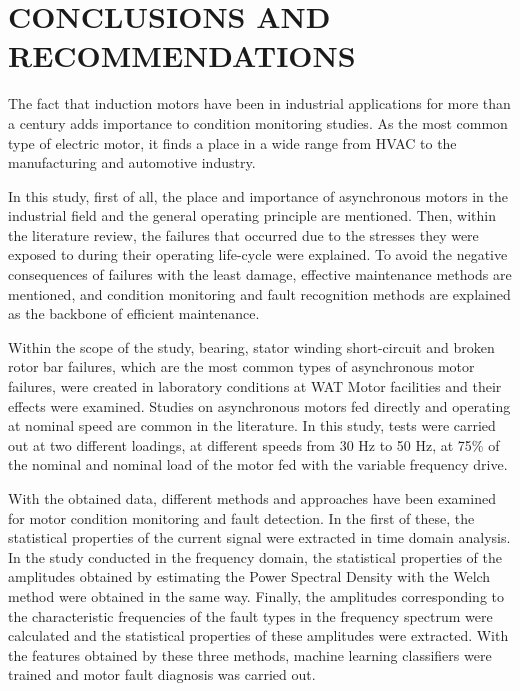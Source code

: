 \chapter{CONCLUSIONS AND RECOMMENDATIONS}\label{Ch5}

The fact that induction motors have been in industrial applications for more than a century adds importance to condition monitoring studies. As the most common type of electric motor, it finds a place in a wide range from HVAC to the manufacturing and automotive industry.

In this study, first of all, the place and importance of asynchronous motors in the industrial field and the general operating principle are mentioned. Then, within the literature review, the failures that occurred due to the stresses they were exposed to during their operating life-cycle were explained. To avoid the negative consequences of failures with the least damage, effective maintenance methods are mentioned, and condition monitoring and fault recognition methods are explained as the backbone of efficient maintenance.

Within the scope of the study, bearing, stator winding short-circuit and broken rotor bar failures, which are the most common types of asynchronous motor failures, were created in laboratory conditions at WAT Motor facilities and their effects were examined. Studies on asynchronous motors fed directly and operating at nominal speed are common in the literature. In this study, tests were carried out at two different loadings, at different speeds from 30 Hz to 50 Hz, at 75\% of the nominal and nominal load of the motor fed with the variable frequency drive.

With the obtained data, different methods and approaches have been examined for motor condition monitoring and fault detection. In the first of these, the statistical properties of the current signal were extracted in time domain analysis. In the study conducted in the frequency domain, the statistical properties of the amplitudes obtained by estimating the Power Spectral Density with the Welch method were obtained in the same way. Finally, the amplitudes corresponding to the characteristic frequencies of the fault types in the frequency spectrum were calculated and the statistical properties of these amplitudes were extracted. With the features obtained by these three methods, machine learning classifiers were trained and motor fault diagnosis was carried out.

